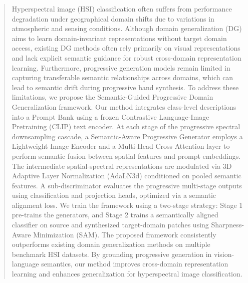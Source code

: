 \begin{abstract}
Hyperspectral image (HSI) classification often suffers from performance degradation under geographical domain shifts due to variations in atmospheric and sensing conditions. Although domain generalization (DG) aims to learn domain-invariant representations without target domain access, existing DG methods often rely primarily on visual representations and lack explicit semantic guidance for robust cross-domain representation learning. Furthermore, progressive generation models remain limited in capturing transferable semantic relationships across domains, which can lead to semantic drift during progressive band synthesis. To address these limitations, we propose the Semantic-Guided Progressive Domain Generalization framework. Our method integrates class-level descriptions into a Prompt Bank using a frozen Contrastive Language-Image Pretraining (CLIP) text encoder. At each stage of the progressive spectral downsampling cascade, a Semantic-Aware Progressive Generator employs a Lightweight Image Encoder and a Multi-Head Cross Attention layer to perform semantic fusion between spatial features and prompt embeddings. The intermediate spatial-spectral representations are modulated via 3D Adaptive Layer Normalization (AdaLN3d) conditioned on pooled semantic features. A sub-discriminator evaluates the progressive multi-stage outputs using classification and projection heads, optimized via a semantic alignment loss. We train the framework using a two-stage strategy: Stage 1 pre-trains the generators, and Stage 2 trains a semantically aligned classifier on source and synthesized target-domain patches using Sharpness-Aware Minimization (SAM). The proposed framework consistently outperforms existing domain generalization methods on multiple benchmark HSI datasets. By grounding progressive generation in vision-language semantics, our method improves cross-domain representation learning and enhances generalization for hyperspectral image classification.
\end{abstract}

